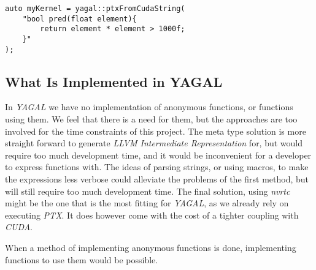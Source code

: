 \begin{lstlisting}[caption={Code showing a possible construction of a kernel based on a string. The string is being sent to the library, where it get extended to correct \textit{CUDA C}, before being sent to \textit{nvrtc}.}, label={code:metaBuildNvrtc}]
auto myKernel = yagal::ptxFromCudaString(
    "bool pred(float element){
        return element * element > 1000f;
    }"
);
\end{lstlisting}

\subsection{What Is Implemented in YAGAL}
In \textit{YAGAL} we have no implementation of anonymous functions, or functions using them. We feel that there is a need for them, but the approaches are too involved for the time constraints of this project. The meta type solution is more straight forward to generate \textit{LLVM Intermediate Representation} for, but would require too much development time, and it would be inconvenient for a developer to express functions with. The ideas of parsing strings, or using macros, to make the expressions less verbose could alleviate the problems of the first method, but will still require too much development time. The final solution, using \textit{nvrtc} might be the one that is the most fitting for \textit{YAGAL}, as we already rely on executing \textit{PTX}. It does however come with the cost of a tighter coupling with \textit{CUDA}.

When a method of implementing anonymous functions is done, implementing functions to use them would be possible.